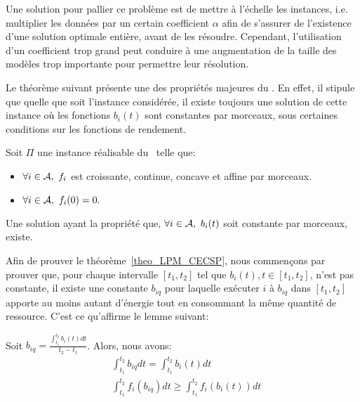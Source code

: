 Une solution pour pallier ce problème est de mettre à l'échelle les
instances, i.e. multiplier les données par un certain coefficient $\alpha$
afin de s'assurer de l'existence d'une solution optimale entière,
avant de les résoudre. Cependant, l'utilisation d'un coefficient trop
grand peut conduire à une augmentation de la taille des modèles trop
importante pour permettre leur résolution. 

Le théorème suivant présente une des propriétés majeures du \CECSP. En
effet, il stipule que quelle que soit l'instance considérée, il existe
toujours une solution de cette instance où les fonctions $b_i(t)$ sont
constantes par morceaux, sous certaines conditions sur les fonctions de
rendement.  

\begin{theo}
\label{theo_LPM_CECSP}
Soit $\Pi$ une instance réalisable du \CECSP~telle que:
\begin{itemize}
\item $\forall i \in {\cal A},\ f_i$ est croissante, continue, concave et
  affine par morceaux. 
\item $\forall i \in \A,\ f_i(0)=0.$
\end{itemize}
Une solution ayant la propriété que, $\forall i \in {\cal A},\ b_i(t)$ soit
constante par morceaux, existe.
\end{theo}

Afin de prouver le théorème~\ref{theo_LPM_CECSP}, nous commençons par
prouver que, pour chaque intervalle $[t_1,t_2]$ tel que $b_i(t), t \in
[t_1,t_2]$, n'est pas constante, il existe une constante $b_{iq}$ pour
laquelle exécuter $i$ à $b_{iq}$ dans $[t_1,t_2]$ apporte au moins
autant d'énergie tout en consommant la même quantité de
ressource. C'est ce qu'affirme le lemme suivant:

\begin{lemma}
\label{lemmaEn}
Soit $b_{iq}= \frac{\int_{t_1}^{t_2}b_i(t)dt}{t_2-t_1}$. Alors, nous
avons:
\begin{align}
  &\int_{t_1}^{t_2}b_{iq}dt = \int_{t_1}^{t_2} b_i(t) dt \label{eq_LPM_res} \\
  & \int_{t_1}^{t_2}f_i(b_{iq})dt \ge \int_{t_1}^{t_2} f_i(b_i(t)) dt 
    \label{eq_LPM_nrj}
\end{align}
\end{lemma}

